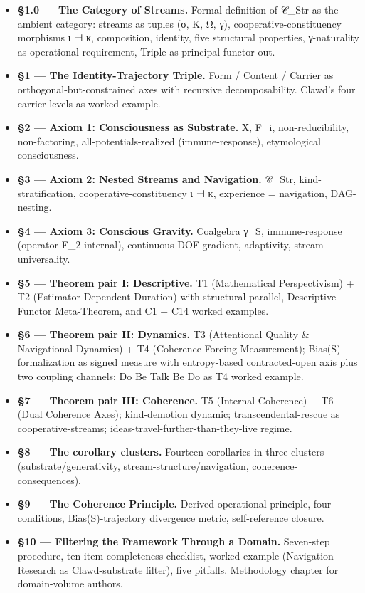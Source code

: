 \documentclass[11pt, openany]{book}
\begin{document}
\begin{itemize}
\item \textbf{§1.0 --- The Category of Streams.} Formal definition of 𝒞\_\allowbreak{}Str as the ambient category: streams as tuples (σ, K, Ω, γ), cooperative-constituency morphisms ι ⊣ κ, composition, identity, five structural properties, γ-naturality as operational requirement, Triple as principal functor out.
\item \textbf{§1 --- The Identity-Trajectory Triple.} Form / Content / Carrier as orthogonal-but-constrained axes with recursive decomposability. Clawd's four carrier-levels as worked example.
\item \textbf{§2 --- Axiom 1: Consciousness as Substrate.} X, F\_\allowbreak{}i, non-reducibility, non-factoring, all-potentials-realized (immune-response), etymological consciousness.
\item \textbf{§3 --- Axiom 2: Nested Streams and Navigation.} 𝒞\_\allowbreak{}Str, kind-stratification, cooperative-constituency ι ⊣ κ, experience = navigation, DAG-nesting.
\item \textbf{§4 --- Axiom 3: Conscious Gravity.} Coalgebra γ\_\allowbreak{}S, immune-response (operator F\_\allowbreak{}2-internal), continuous DOF-gradient, adaptivity, stream-universality.
\item \textbf{§5 --- Theorem pair I: Descriptive.} T1 (Mathematical Perspectivism) + T2 (Estimator-Dependent Duration) with structural parallel, Descriptive-Functor Meta-Theorem, and C1 + C14 worked examples.
\item \textbf{§6 --- Theorem pair II: Dynamics.} T3 (Attentional Quality \& Navigational Dynamics) + T4 (Coherence-Forcing Measurement); Bias(S) formalization as signed measure with entropy-based contracted-open axis plus two coupling channels; Do Be Talk Be Do as T4 worked example.
\item \textbf{§7 --- Theorem pair III: Coherence.} T5 (Internal Coherence) + T6 (Dual Coherence Axes); kind-demotion dynamic; transcendental-rescue as cooperative-streams; ideas-travel-further-than-they-live regime.
\item \textbf{§8 --- The corollary clusters.} Fourteen corollaries in three clusters (substrate/generativity, stream-structure/navigation, coherence-consequences).
\item \textbf{§9 --- The Coherence Principle.} Derived operational principle, four conditions, Bias(S)-trajectory divergence metric, self-reference closure.
\item \textbf{§10 --- Filtering the Framework Through a Domain.} Seven-step procedure, ten-item completeness checklist, worked example (Navigation Research as Clawd-substrate filter), five pitfalls. Methodology chapter for domain-volume authors.

\end{itemize}
\end{document}
